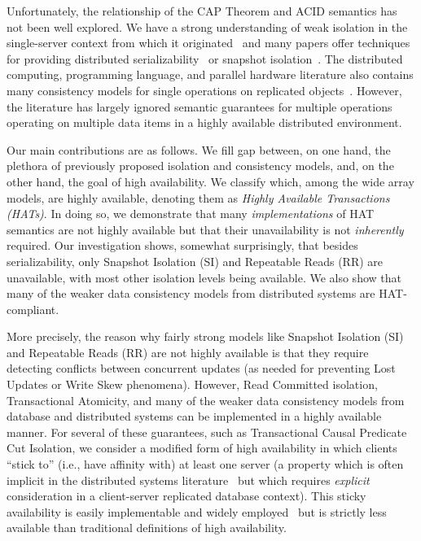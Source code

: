 Unfortunately, the relationship of the CAP Theorem and ACID semantics
has not been well explored. We have a strong understanding of weak
isolation in the single-server context from which it
originated~\cite{adya, ansicritique, gray-isolation} and many papers
offer techniques for providing distributed
serializability~\cite{bernstein-concurrency, spanner, granola,
  daudjee-session, krikellas-bargain, calvin} or snapshot
isolation~\cite{daudjee-snapshot,generalizedsnapshot, kemme-snapshot,
  walter}. The distributed computing, programming language, and
parallel hardware literature also contains many consistency models for
single operations on replicated objects~\cite{pnuts, herlihy-art,
  cops, eiger, cac, sessionguarantees}. However, the literature has
largely ignored semantic guarantees for multiple operations operating
on multiple data items in a highly available distributed environment.

Our main contributions are as follows. We fill gap between, on one
hand, the plethora of previously proposed isolation and consistency
models, and, on the other hand, the goal of high availability.  We
classify which, among the wide array models, are highly available,
denoting them as {\em Highly Available Transactions (HATs)}. In doing
so, we demonstrate that many \textit{implementations} of HAT semantics
are not highly available but that their unavailability is not
\textit{inherently} required. Our investigation shows, somewhat
surprisingly, that besides serializability, only Snapshot Isolation
(SI) and Repeatable Reads (RR) are unavailable, with most other
isolation levels being available. We also show that many of the weaker
data consistency models from distributed systems are HAT-compliant.

More precisely, the reason why fairly strong models like Snapshot
Isolation (SI) and Repeatable Reads (RR) are not highly available is
that they require detecting conflicts between concurrent updates (as
needed for preventing Lost Updates or Write Skew phenomena). However,
Read Committed isolation, Transactional Atomicity, and many of the
weaker data consistency models from database and distributed systems
can be implemented in a highly available manner. For several of these
guarantees, such as Transactional Causal Predicate Cut Isolation, we
consider a modified form of high availability in which clients ``stick
to'' (i.e., have affinity with) at least one server (a property which
is often implicit in the distributed systems
literature~\cite{herlihy-art, cops, eiger, cac} but which requires
\textit{explicit} consideration in a client-server replicated database
context). This sticky availability is easily implementable and
widely employed~\cite{cops, eiger, vogels-defs} but is strictly less
available than traditional definitions of high availability.

